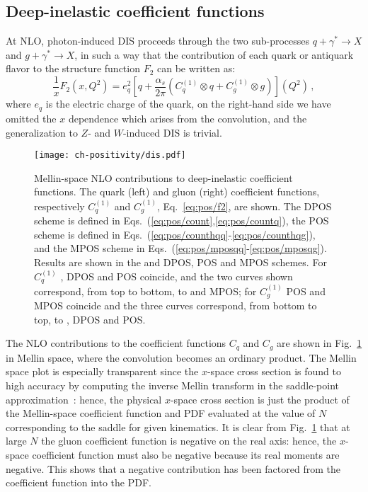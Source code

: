 \subsection{Deep-inelastic coefficient functions}
\label{sec:discf}
At NLO, photon-induced DIS proceeds through the two
sub-processes $q+\gamma^*\to X$ and $g+\gamma^*\to X$, in such a way
that the contribution of each quark or antiquark flavor to the
structure function $F_2$ can be written as:
\begin{equation}\label{eq:pos/f2}
 \frac{1}{x} F_2(x,Q^2)= e_q^2 \left[q
 +\frac{\alpha_s}{2\pi}\left( C^{(1)}_q \otimes q+ C^{(1)}_g \otimes
 g\right)\right](Q^2)\,,
 \end{equation}
where $e_q$ is the electric charge of the quark, on the right-hand
side we have omitted the $x$ dependence which arises from the
convolution,
and the
generalization to $Z$- and $W$-induced DIS is trivial.

\begin{figure}[t]
  \begin{center}
    \texttt{[image: ch-positivity/dis.pdf]}
    \caption{\small Mellin-space NLO contributions to deep-inelastic coefficient
      functions. The quark (left) and gluon (right) coefficient
      functions, respectively $C_q^{(1)}$ and $C_g^{(1)}$, Eq.~\ref{eq:pos/f2}, are
      shown. The DPOS
      scheme is defined in Eqs.~(\ref{eq:pos/count},\ref{eq:pos/countq}), the POS
      scheme is defined in Eqs.~(\ref{eq:pos/counthqq}-\ref{eq:pos/counthqg}),
      and the MPOS scheme
      in Eqs.~(\ref{eq:pos/mposqq}-\ref{eq:pos/mposqg}).
      Results are shown in the \msbar{} and DPOS, POS and MPOS
      schemes. For  $C_q^{(1)}$ \msbar{}, DPOS and POS
      coincide, and the two curves shown correspond, from top to
      bottom, to \msbar{} and MPOS; for $C_g^{(1)}$ POS and MPOS
      coincide and the three
      curves correspond,
      from  bottom to top, to \msbar{}, DPOS and POS.
    \label{fig:dis} }
  \end{center}
\end{figure}
  The
  \msbar{} NLO contributions to the coefficient functions
  $C_q$ and $C_g$ are shown in Fig.~\ref{fig:dis} in Mellin space,
  where the convolution becomes an ordinary product. The
  Mellin space plot is especially transparent since the $x$-space
  cross section is found to high accuracy by computing the inverse
  Mellin transform in the saddle-point
  approximation~\cite{Bonvini:2012an}: hence, the physical  $x$-space
  cross section is just the product of the Mellin-space coefficient
  function and PDF evaluated at the value of $N$ corresponding to the
  saddle for given kinematics. 
  It is clear  from Fig.~\ref{fig:dis} that at
  large $N$ the gluon coefficient function is negative on the real
  axis: hence, the $x$-space coefficient function must also be
  negative because its real moments are negative. This shows
 that a negative contribution has been factored from the coefficient
 function into the PDF. 



